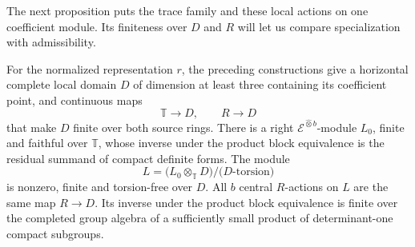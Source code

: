 The next proposition puts the trace family and these local actions on
one coefficient module. Its finiteness over $D$ and $R$ will let us
compare specialization with admissibility.

\begin{proposition}\label{prop:family}
For the normalized representation $r$, the preceding constructions
give a horizontal complete local domain $D$ of dimension at least
three containing its coefficient point, and continuous maps
\[
 \mathbb T\longrightarrow D,\qquad R\longrightarrow D
\]
that make $D$ finite over both source rings.  There is a right
$\mathcal E^{\widehat\otimes b}$-module $L_0$, finite and faithful
over $\mathbb T$, whose inverse under the product block equivalence
is the residual summand of compact definite forms.  The module
\[
 L=\bigl(L_0\otimes_{\mathbb T}D\bigr)
       \big/\bigl(\text{$D$-torsion}\bigr)
\]
is nonzero, finite and torsion-free over $D$.  All $b$ central
$R$-actions on $L$ are the same map $R\to D$.  Its inverse under
the product block equivalence is finite over the completed group
algebra of a sufficiently small product of determinant-one compact
subgroups.
\end{proposition}

